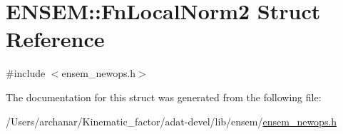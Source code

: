 \hypertarget{structENSEM_1_1FnLocalNorm2}{}\section{E\+N\+S\+EM\+:\+:Fn\+Local\+Norm2 Struct Reference}
\label{structENSEM_1_1FnLocalNorm2}


{\ttfamily \#include $<$ensem\+\_\+newops.\+h$>$}



The documentation for this struct was generated from the following file\+:\begin{DoxyCompactItemize}
\item 
/\+Users/archanar/\+Kinematic\+\_\+factor/adat-\/devel/lib/ensem/\mbox{\hyperlink{adat-devel_2lib_2ensem_2ensem__newops_8h}{ensem\+\_\+newops.\+h}}\end{DoxyCompactItemize}
